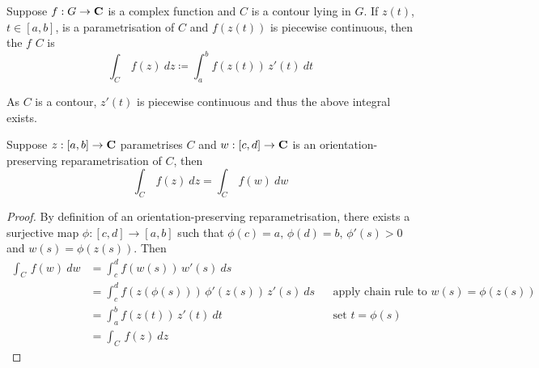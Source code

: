 \begin{definition}
Suppose $f:G \to \mathbf C$ is a complex function and $C$ is a contour lying in $G$. If $z(t)$, $t \in [a,b]$, is a parametrisation of $C$ and $f(z(t))$ is piecewise continuous, then the  {\color{darkred}$f$}  {\color{darkred}$C$} is
\[\int_C\, f(z)\ dz \coloneqq \int_a^b f(z(t))\,z'(t)\ dt\]
\begin{remark}
As $C$ is a contour, $z'(t)$ is piecewise continuous and thus the above integral exists.
\end{remark}
\end{definition}

\medskip

\begin{proposition}
Suppose $z:[a,b] \to \mathbf C$ parametrises $C$ and $w:[c,d] \to \mathbf C$ is an orientation-preserving reparametrisation of $C$, then
\[\int_C\,f(z)\ dz = \int_C\, f(w)\ dw\]
\end{proposition}
\begin{proof}
By definition of an orientation-preserving reparametrisation, there exists a surjective map $\phi:[c,d] \to [a,b]$ such that $\phi(c) = a,\,\phi(d) = b,\, \phi'(s) > 0$ and $w(s) = \phi(z(s))$. Then
\begin{align*}
\int_C\, f(w)\ dw &= \int_c^d f(w(s))\,w'(s)\ ds\\[0.5em]
 &= \int_c^d f(z(\phi(s)))\,\phi'(z(s))\,z'(s)\ ds && \text{apply chain rule to $w(s) = \phi(z(s))$}\\[0.5em]
 &= \int_a^b f(z(t))\,z'(t)\ dt && \text{set $t = \phi(s)$}\\[0.5em]
 &= \int_C\, f(z)\ dz
\end{align*}
\end{proof}

\medskip

